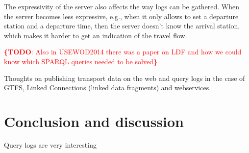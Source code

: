 \documentclass{sig-alternate}
\newcommand{\todo}[1]{\noindent\textcolor{red}{{\bf \{TODO}: #1{\bf \}}}}
\begin{document}


The expressivity of the server also affects the way logs can be gathered.
When the server becomes less expressive, e.g., when it only allows to set a departure station and a departure time, then the server doesn't know the arrival station, which makes it harder to get an indication of the travel flow.

\todo{Also in USEWOD2014 there was a paper on LDF and how we could know which SPARQL queries needed to be solved}

Thoughts on publishing transport data on the web and query logs in the case of GTFS, Linked Connections\cite{lc} (linked data fragments\cite{ldf}) and webservices.

\section{Conclusion and discussion}
\label{sec:conclusion}

Query logs are very interesting

\let\oldsection\section
\renewcommand{\section}[2][1]{\oldsection{#1}\vspace{-3pt}}



\end{document}
